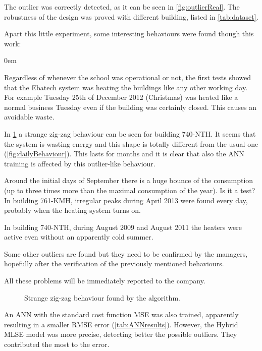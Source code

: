 \documentclass{sig-alternate-sigmod07}
\begin{document}
The outlier was correctly detected, as it can be seen in \cref{fig:outlierReal}. The robustness of the design was proved with different building, listed in \cref{tab:dataset}.

Apart this little experiment, some interesting behaviours were found though this work:
\begin{description}[leftmargin=1pc]
\itemsep0em
  \item[Holidays] Regardless of whenever the school was operational or not, the first tests showed that the Ebatech system was heating the buildings like any other working day. For example Tuesday 25th of December 2012 (Christmas) was heated like a normal business Tuesday even if the building was certainly closed. This causes an avoidable waste.
  \item[Consumption bounces] In \cref{fig:zigzag} a strange zig-zag behaviour can be seen for building 740-NTH. It seems that the system is wasting energy and this shape is totally different from the usual one (\cref{fig:dailyBehaviour}). This lasts for months and it is clear that also the ANN training is affected by this outlier-like behaviour.
\item[Peaks] Around the initial days of September there is a huge bounce of the consumption (up to three times more than the maximal consumption of the year). Is it a test?
In building 761-KMH, irregular peaks during April 2013 were found every day, probably when the heating system turns on.
\item[August with heaters] In building 740-NTH, during August 2009 and August 2011 the heaters were active even without an apparently cold summer.
\item[Outliers] Some other outliers are found but they need to be confirmed by the managers, hopefully after the verification of the previously mentioned behaviours.
\end{description}
All these problems will be immediately reported to the company.

\begin{figure}
\centering
{}
\caption{Strange zig-zag behaviour found by the algorithm.}
\label{fig:zigzag}
\end{figure}

An ANN with the standard cost function MSE was also trained, apparently resulting in a smaller RMSE error (\cref{tab:ANNresults}). However, the Hybrid MLSE model was more precise, detecting better the possible outliers. They contributed the most to the error.
\end{document}
